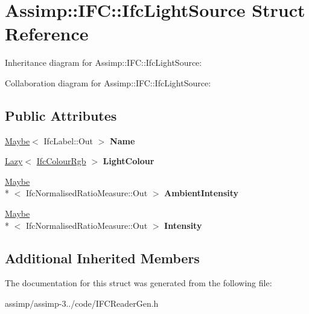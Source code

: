 \hypertarget{struct_assimp_1_1_i_f_c_1_1_ifc_light_source}{\section{Assimp\+:\+:I\+F\+C\+:\+:Ifc\+Light\+Source Struct Reference}
\label{struct_assimp_1_1_i_f_c_1_1_ifc_light_source}
}


Inheritance diagram for Assimp\+:\+:I\+F\+C\+:\+:Ifc\+Light\+Source\+:


Collaboration diagram for Assimp\+:\+:I\+F\+C\+:\+:Ifc\+Light\+Source\+:
\subsection*{Public Attributes}
\begin{DoxyCompactItemize}
\item 
\hypertarget{struct_assimp_1_1_i_f_c_1_1_ifc_light_source_a11158f86a2866e8b619aeb26129159b1}{\hyperlink{struct_assimp_1_1_s_t_e_p_1_1_maybe}{Maybe}$<$ Ifc\+Label\+::\+Out $>$ {\bfseries Name}}\label{struct_assimp_1_1_i_f_c_1_1_ifc_light_source_a11158f86a2866e8b619aeb26129159b1}

\item 
\hypertarget{struct_assimp_1_1_i_f_c_1_1_ifc_light_source_a3c234934749da17f845af576ff9244b5}{\hyperlink{struct_assimp_1_1_s_t_e_p_1_1_lazy}{Lazy}$<$ \hyperlink{struct_assimp_1_1_i_f_c_1_1_ifc_colour_rgb}{Ifc\+Colour\+Rgb} $>$ {\bfseries Light\+Colour}}\label{struct_assimp_1_1_i_f_c_1_1_ifc_light_source_a3c234934749da17f845af576ff9244b5}

\item 
\hypertarget{struct_assimp_1_1_i_f_c_1_1_ifc_light_source_a7367ee1544f9d4fd0f02b9092659e396}{\hyperlink{struct_assimp_1_1_s_t_e_p_1_1_maybe}{Maybe}\\*
$<$ Ifc\+Normalised\+Ratio\+Measure\+::\+Out $>$ {\bfseries Ambient\+Intensity}}\label{struct_assimp_1_1_i_f_c_1_1_ifc_light_source_a7367ee1544f9d4fd0f02b9092659e396}

\item 
\hypertarget{struct_assimp_1_1_i_f_c_1_1_ifc_light_source_a98c060d7885499ab4156641ddbf6ddf8}{\hyperlink{struct_assimp_1_1_s_t_e_p_1_1_maybe}{Maybe}\\*
$<$ Ifc\+Normalised\+Ratio\+Measure\+::\+Out $>$ {\bfseries Intensity}}\label{struct_assimp_1_1_i_f_c_1_1_ifc_light_source_a98c060d7885499ab4156641ddbf6ddf8}

\end{DoxyCompactItemize}
\subsection*{Additional Inherited Members}


The documentation for this struct was generated from the following file\+:\begin{DoxyCompactItemize}
\item 
assimp/assimp-\/3../code/I\+F\+C\+Reader\+Gen.\+h\end{DoxyCompactItemize}
